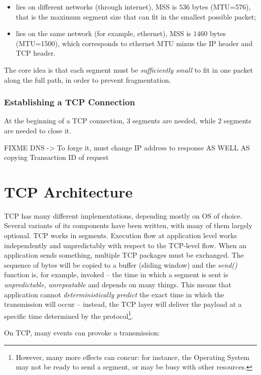 \documentclass[a4paper, 11pt]{report}
\begin{document}
\begin{itemize}
    \item lies on different networks (through internet), MSS is $536$ bytes
        (MTU=576), that is the maximum segment size that can fit in the
        smallest possible packet;
    \item lies on the same network (for example, ethernet), MSS is $1460$ bytes
        (MTU=1500), which corresponds to ethernet MTU minus the IP header and
        TCP header.
\end{itemize}

The core idea is that each segment must be \emph{sufficiently small} to fit in
one packet along the full path, in order to prevent fragmentation.

\subsubsection{Establishing a TCP Connection}

At the beginning of a TCP connection, $3$ segments are needed, while $2$
segments are needed to close it.

FIXME DNS -> To forge it, must change IP address to
response AS WELL AS copying Transaction ID of request

\section{TCP Architecture}

TCP has many different implementations, depending mostly on OS of choice.
Several variants of its components have been written, with many of them largely
optional. TCP works in segments. Execution flow at application level works
independently and unpredictably with respect to the TCP-level flow. When an
application sends something, multiple TCP packages must be exchanged. The
sequence of bytes will be copied to a buffer (sliding window) and the
\emph{send()} function is, for example, invoked \--- the time in which a
segment is sent is \emph{unpredictable}, \emph{unrepeatable} and depends on
many things. This means that application cannot \emph{deterministically
predict} the exact time in which the transmission will occur \--- instead, the
TCP layer will deliver the payload at a specific time determined by the
protocol\footnote{However, many more effects can concur: for instance, the
Operating System may not be ready to send a segment, or may be busy with other
resources.}.

On TCP, many events can provoke a transmission:
\end{document}
